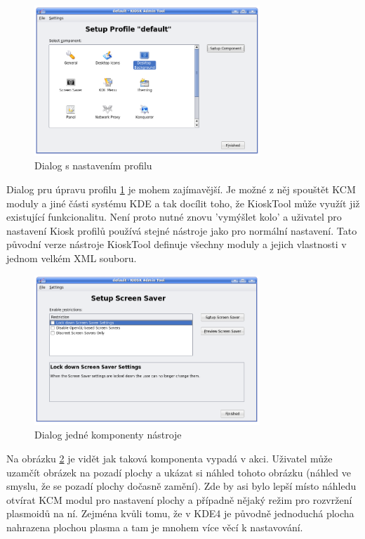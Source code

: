 \begin{figure}[h]
    \centering
    \includegraphics[width=8.5cm]{obrazky/KioskToolKDE3/seznam_komponent.png}
    \caption{Dialog s nastavením profilu}
    \label{fig:kt3_nast_prof}
\end{figure}
Dialog pru úpravu profilu \ref{fig:kt3_nast_prof} je mohem zajímavější. Je možné
z něj spouštět KCM moduly a jiné části systému KDE a tak docílit toho,
že KioskTool může využít již existující funkcionalitu. Není proto nutné znovu
'vymýšlet kolo' a uživatel pro nastavení Kiosk profilů používá stejné nástroje
jako pro normální nastavení. Tato původní verze nástroje KioskTool definuje
všechny moduly a jejich vlastnosti v jednom velkém XML souboru.

\begin{figure}[h]
    \centering
    \includegraphics[width=8.5cm]{obrazky/KioskToolKDE3/ukazka_komponenty.png}
    \caption{Dialog jedné komponenty nástroje}
    \label{fig:kt3_nast_komp}
\end{figure}
Na obrázku \ref{fig:kt3_nast_komp} je vidět jak taková komponenta vypadá
v akci. Uživatel může uzamčít obrázek na pozadí plochy a ukázat si náhled tohoto
obrázku (náhled ve smyslu, že se pozadí plochy dočasně zamění). Zde by asi bylo
lepší místo náhledu otvírat KCM modul pro nastavení plochy a případně nějaký
režim pro rozvržení plasmoidů  na ní. Zejména kvůli tomu, že v KDE4 je původně %
jednoduchá plocha nahrazena plochou plasma a tam je mnohem více věcí
k nastavování.

